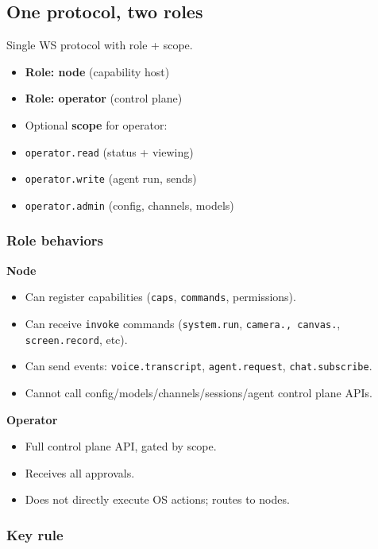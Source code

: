 \subsection{One protocol, two roles}


Single WS protocol with role + scope.

\begin{itemize}
  \item \textbf{Role: node} (capability host)
  \item \textbf{Role: operator} (control plane)
  \item Optional \textbf{scope} for operator:
  \item \texttt{operator.read} (status + viewing)
  \item \texttt{operator.write} (agent run, sends)
  \item \texttt{operator.admin} (config, channels, models)
\end{itemize}


\subsubsection{Role behaviors}


\textbf{Node}

\begin{itemize}
  \item Can register capabilities (\texttt{caps}, \texttt{commands}, permissions).
  \item Can receive \texttt{invoke} commands (\texttt{system.run}, \texttt{camera.\textit{}, \texttt{canvas.}}, \texttt{screen.record}, etc).
  \item Can send events: \texttt{voice.transcript}, \texttt{agent.request}, \texttt{chat.subscribe}.
  \item Cannot call config/models/channels/sessions/agent control plane APIs.
\end{itemize}


\textbf{Operator}

\begin{itemize}
  \item Full control plane API, gated by scope.
  \item Receives all approvals.
  \item Does not directly execute OS actions; routes to nodes.
\end{itemize}


\subsubsection{Key rule}


